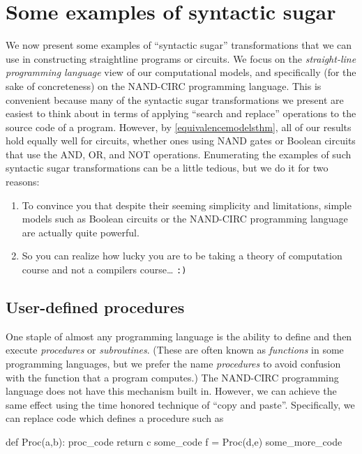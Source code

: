 \section{Some examples of syntactic sugar}\label{secsyntacticsugar}

We now present some examples of ``syntactic sugar'' transformations that
we can use in constructing straightline programs or circuits. We focus
on the \emph{straight-line programming language} view of our
computational models, and specifically (for the sake of concreteness) on
the NAND-CIRC programming language. This is convenient because many of
the syntactic sugar transformations we present are easiest to think
about in terms of applying ``search and replace'' operations to the
source code of a program. However, by \cref{equivalencemodelsthm}, all
of our results hold equally well for circuits, whether ones using NAND
gates or Boolean circuits that use the AND, OR, and NOT operations.
Enumerating the examples of such syntactic sugar transformations can be
a little tedious, but we do it for two reasons:

\begin{enumerate}
\def\labelenumi{\arabic{enumi}.}
\item
  To convince you that despite their seeming simplicity and limitations,
  simple models such as Boolean circuits or the NAND-CIRC programming
  language are actually quite powerful.
\item
  So you can realize how lucky you are to be taking a theory of
  computation course and not a compilers course\ldots{} \texttt{:)}
\end{enumerate}

\subsection{User-defined procedures}\label{User-defined-procedures}

One staple of almost any programming language is the ability to define
and then execute \emph{procedures} or \emph{subroutines}. (These are
often known as \emph{functions} in some programming languages, but we
prefer the name \emph{procedures} to avoid confusion with the function
that a program computes.) The NAND-CIRC programming language does not
have this mechanism built in. However, we can achieve the same effect
using the time honored technique of ``copy and paste''. Specifically, we
can replace code which defines a procedure such as

\begin{code}
def Proc(a,b):
    proc_code
    return c
some_code
f = Proc(d,e)
some_more_code
\end{code}

